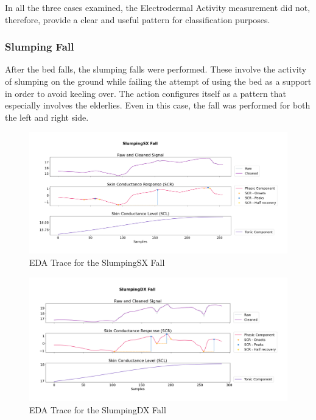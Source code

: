 In all the three cases examined, the Electrodermal Activity measurement did not, therefore, provide a clear and useful pattern for classification purposes.

\subsubsection{Slumping Fall}\label{subsubsec:slumping-fall}

After the bed falls, the slumping falls were performed. These involve the activity of slumping on the ground while failing the attempt of using the bed as a support in order to avoid keeling over. The action configures itself as a pattern that especially involves the elderlies. Even in this case, the fall was performed for both the left and right side.

\begin{figure}[h!]
    \centering
    \includegraphics[width=\textwidth]{./images/movisens/SlumpingSX.png}
    \caption{EDA Trace for the SlumpingSX Fall}
    \label{fig:movisens-slumpsx}
\end{figure}

\begin{figure}[h!]
    \centering
    \includegraphics[width=\textwidth]{./images/movisens/SlumpingDX.png}
    \caption{EDA Trace for the SlumpingDX Fall}
    \label{fig:movisens-slumpdx}
\end{figure}

